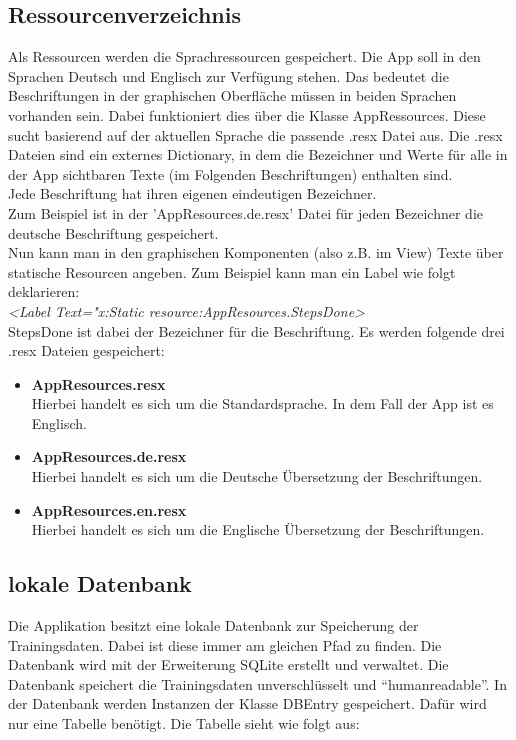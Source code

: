 \documentclass[a4paper,12pt]{article}
\begin{document}
\subsection{Ressourcenverzeichnis}
Als Ressourcen werden die Sprachressourcen gespeichert. Die App soll in den Sprachen Deutsch und Englisch zur Verfügung stehen. Das bedeutet die Beschriftungen in der graphischen Oberfläche müssen in beiden Sprachen vorhanden sein. Dabei funktioniert dies über die Klasse AppRessources. Diese sucht basierend auf der aktuellen Sprache die passende .resx Datei aus. Die .resx Dateien sind ein externes Dictionary, in dem die Bezeichner und Werte für alle in der App sichtbaren Texte (im Folgenden Beschriftungen) enthalten sind.\\
Jede Beschriftung hat ihren eigenen eindeutigen Bezeichner. \\Zum Beispiel ist in der 'AppResources.de.resx' Datei für jeden Bezeichner die deutsche Beschriftung gespeichert.\\
Nun kann man in den graphischen Komponenten (also z.B. im View) Texte über statische Resourcen angeben.
Zum Beispiel kann man ein Label wie folgt deklarieren:\\\textit{<Label Text="{x:Static resource:AppResources.StepsDone}>}\\ StepsDone ist dabei der Bezeichner für die Beschriftung.
Es werden folgende drei .resx Dateien gespeichert: 
\begin{itemize}
	\item \textbf{AppResources.resx}\\Hierbei handelt es sich um die Standardsprache. In dem Fall der App ist es Englisch.
	\item \textbf{AppResources.de.resx}\\Hierbei handelt es sich um die Deutsche Übersetzung der Beschriftungen.
	\item \textbf{AppResources.en.resx}\\Hierbei handelt es sich um die Englische Übersetzung der Beschriftungen.
\end{itemize}

\subsection{lokale Datenbank}
Die Applikation besitzt eine lokale \gls{Datenbank} zur Speicherung der Trainingsdaten. Dabei ist diese immer am gleichen Pfad zu finden. Die Datenbank wird mit der Erweiterung \gls{SQLite} erstellt und verwaltet. Die Datenbank speichert die Trainingsdaten unverschlüsselt und ``humanreadable''. In der Datenbank werden Instanzen der Klasse DBEntry gespeichert. Dafür wird nur eine Tabelle benötigt. Die Tabelle sieht wie folgt aus:
\end{document}
